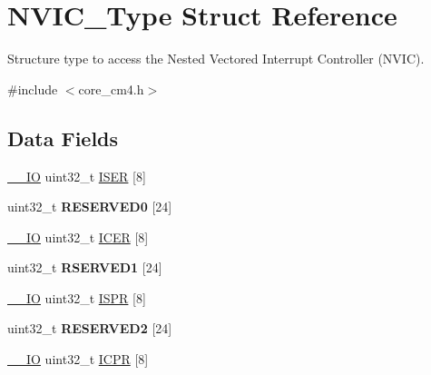 \hypertarget{struct_n_v_i_c___type}{}\section{N\+V\+I\+C\+\_\+\+Type Struct Reference}
\label{struct_n_v_i_c___type}


Structure type to access the Nested Vectored Interrupt Controller (N\+V\+IC).  




{\ttfamily \#include $<$core\+\_\+cm4.\+h$>$}

\subsection*{Data Fields}
\begin{DoxyCompactItemize}
\item 
\hyperlink{group___c_m_s_i_s__core__definitions_gaec43007d9998a0a0e01faede4133d6be}{\+\_\+\+\_\+\+IO} uint32\+\_\+t \hyperlink{struct_n_v_i_c___type_a0bf79013b539f9f929c75bd50f8ec67d}{I\+S\+ER} \mbox{[}8\mbox{]}
\item 
\mbox{\label{struct_n_v_i_c___type_ac881b676be4d9659951f43c2fccb34b4}} 
uint32\+\_\+t {\bfseries R\+E\+S\+E\+R\+V\+E\+D0} \mbox{[}24\mbox{]}
\item 
\hyperlink{group___c_m_s_i_s__core__definitions_gaec43007d9998a0a0e01faede4133d6be}{\+\_\+\+\_\+\+IO} uint32\+\_\+t \hyperlink{struct_n_v_i_c___type_af458bc93cfb899fc1c77c5d1f39dde88}{I\+C\+ER} \mbox{[}8\mbox{]}
\item 
\mbox{\label{struct_n_v_i_c___type_ab993fe7f0b489b30bc677ccf53426a92}} 
uint32\+\_\+t {\bfseries R\+S\+E\+R\+V\+E\+D1} \mbox{[}24\mbox{]}
\item 
\hyperlink{group___c_m_s_i_s__core__definitions_gaec43007d9998a0a0e01faede4133d6be}{\+\_\+\+\_\+\+IO} uint32\+\_\+t \hyperlink{struct_n_v_i_c___type_ab39acf254b485e3ad71b18aa9f1ca594}{I\+S\+PR} \mbox{[}8\mbox{]}
\item 
\mbox{\label{struct_n_v_i_c___type_a86dfd6bf6c297be163d078945f67e8b6}} 
uint32\+\_\+t {\bfseries R\+E\+S\+E\+R\+V\+E\+D2} \mbox{[}24\mbox{]}
\item 
\hyperlink{group___c_m_s_i_s__core__definitions_gaec43007d9998a0a0e01faede4133d6be}{\+\_\+\+\_\+\+IO} uint32\+\_\+t \hyperlink{struct_n_v_i_c___type_a8165d9a8c0090021e56bbe91c2c44667}{I\+C\+PR} \mbox{[}8\mbox{]}

\end{DoxyCompactItemize}
